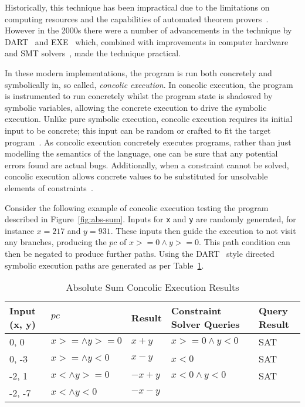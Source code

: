 \documentclass[]{final_report}
\begin{document}
Historically, this technique has been impractical due to the limitations on computing resources and the capabilities of automated theorem provers~\cite{king1976symbolic}. However in the 2000s there were a number of advancements in the technique by DART~\cite{godefroid2005dart} and EXE~\cite{cadar2008exe} which, combined with improvements in computer hardware and SMT solvers~\cite{de2011satisfiability}, made the technique practical.

In these modern implementations, the program is run both concretely and symbolically in, so called, \textit{concolic execution}. In concolic execution, the program is instrumented to run concretely whilst the program state is shadowed by symbolic variables, allowing the concrete execution to drive the symbolic execution. Unlike pure symbolic execution, concolic execution requires its initial input to be concrete; this input can be random or crafted to fit the target program~\cite{godefroid2008grammar,cadar2013symbolic}. As concolic execution concretely executes programs, rather than just modelling the semantics of the language, one can be sure that any potential errors found are actual bugs. Additionally, when a constraint cannot be solved, concolic execution allows concrete values to be substituted for unsolvable elements of constraints~\cite{sen2007concolic,sen2005cute}.

Consider the following example of concolic execution testing the program described in Figure~\ref{fig:abs-sum}. Inputs for \lstinline{x} and \lstinline{y} are randomly generated, for instance $x=217$ and $y=931$. These inputs then guide the execution to not visit any branches, producing the $pc$ of $x >= 0 \land y >=0$. This path condition can then be negated to produce further paths. Using the DART~\cite{godefroid2005dart} style directed symbolic execution paths are generated as per Table~\ref{abs-sum-ce-table}.

\begin{table}[t]
\centering
\begin{tabular}{|l|l|l|l|l|}
\hline
Input (x, y) & $pc$ & Result & Constraint Solver Queries & Query Result \\ \hline
0, 0 & $x >= \land y >= 0$ & $x+y$ & $x >=0 \land y < 0 $ & SAT \\ \hline
0, -3 & $x >= \land y < 0$ & $x - y$ & $x <0 $ & SAT \\ \hline
-2, 1 & $x < \land y >= 0$ & $-x+y$ & $x<0 \land y < 0 $ & SAT \\ \hline
-2, -7 & $x < \land y < 0$ & $-x-y$ &  &  \\ \hline
\end{tabular}
\caption{Absolute Sum Concolic Execution Results}
\label{abs-sum-ce-table}
\end{table}
\end{document}

